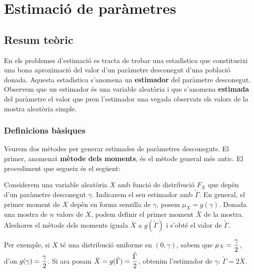 \chapter{Estimaci\'o de par\`ametres}
\section{Resum te\`oric}

En els problemes d'estimaci\'o es tracta de trobar una estad\'{\i}stica
 que
constitueixi una bona aproximaci\'o del valor d'un par\`ametre desconegut
 d'una
poblaci\'o donada. Aquesta estad\'{\i}stica 
s'anomena un {\bf estimador} del par\`ametre
desconegut. Observem que un estimador \'es una variable aleat\`oria i 
que s'anomena {\bf estimada} del par\`ametre el valor que pren 
l'estimador una vegada observats els valors de la mostra aleat\`oria simple.

\subsection{Definicions b\`asiques}

Veurem dos m\`etodes per generar estimades de par\`ametres desconeguts. 
El primer, anomenat {\bf m\`etode dels moments}, 
 \'es el m\`etode general m\'es antic. El
procediment que segueix \'es el seg\"uent:

Considerem una variable aleat\`oria $X$ amb funci\'o de distribuci\'o 
$F_X$ que dep\`en d'un par\`ametre desconegut $\gamma$. 
Indicarem el seu estimador amb $\tilde{\Gamma}$. 
En general, el primer moment de $X$ dep\`en en forma senzilla de
$\gamma$, posem $\mu_X = g(\gamma)$. Donada una mostra de $n$ valors de $X$,
podem definir el primer moment $\bar{X}$ de la mostra. Aleshores el m\`etode dels
moments iguala $\bar{X}$ a $g(\tilde{\Gamma})$ i s'obt\'e el valor de
$\tilde{\Gamma}$.

Per exemple, si $X$ t\'e una distribuci\'o uniforme
 en $(0,\gamma)$, sabem que
$\displaystyle \mu_X = {\gamma \over 2}$, d'on $\displaystyle g(\gamma) =
{\gamma \over 2}$. Si ara posam $\displaystyle \bar{X} = g(\tilde{\Gamma}) =
{\tilde{\Gamma} \over 2}$, obtenim l'estimador de $\gamma$: $\tilde{\Gamma} = 2
\bar{X}$.

